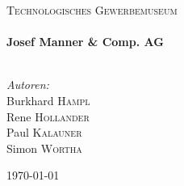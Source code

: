 \begin{titlepage}
	
	\center
	
	\textsc{\LARGE Technologisches Gewerbemuseum}\\[1.5cm]
	
	\HRule
	\\[0.4cm]
	{\huge \bfseries Josef Manner \& Comp. AG}
	\\[0.2cm]
	{\LARGE \documentName}
	\HRule
	\\[1.5cm]
	
	\begin{minipage}{0.5\textwidth}
		\begin{center} \large
			\emph{Autoren:}\\
			Burkhard \textsc{Hampl}\\
			Rene \textsc{Hollander}\\
			Paul \textsc{Kalauner}\\
			Simon \textsc{Wortha}
		\end{center}
	\end{minipage}
	
	\null
	\vfill
	{\large \today}
	
\end{titlepage}
